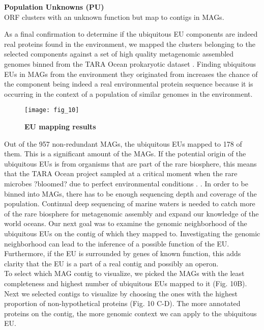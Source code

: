 \begin{table}[]
\textbf{Population Unknowns (PU)}\\
ORF clusters with an unknown function but map to contigs in MAGs. 

As a final confirmation to determine if the ubiquitous EU components are indeed real proteins found in the environment, we mapped the clusters belonging to the selected components against a set of high quality metagenomic assembled genomes binned from the TARA Ocean prokaryotic dataset \citep{Delmont_2017}. Finding ubiquitous EUs in MAGs from the environment they originated from increases the chance of the component being indeed a real environmental protein sequence because it is occurring in the context of a population of similar genomes in the environment. \\

\begin{figure}[h!]
	\centering
	\texttt{[image: fig\_10]}
	\caption{\textbf{EU mapping results}}\label{fig10}
\end{figure}

Out of the 957 non-redundant MAGs, the ubiquitous EUs mapped to 178 of them. This is a significant amount of the MAGs. If the potential origin of the ubiquitous EUs is from organisms that are part of the rare biosphere, this means that the TARA Ocean project sampled at a critical moment when the rare microbes ?bloomed? due to perfect environmental conditions \citep{Gobet_2011}. . In order to be binned into MAGs, there has to be enough sequencing depth and coverage of the population. Continual deep sequencing of marine waters is needed to catch more of the rare biosphere for metagenomic assembly and expand our knowledge of the world oceans. 
Our next goal was to examine the genomic neighborhood of the ubiquitous EUs on the contig of which they mapped to. Investigating the genomic neighborhood can lead to the inference of a possible function of the EU. Furthermore, if the EU is surrounded by genes of known function, this adds clarity that the EU is a part of a real contig and possibly an operon.\\

To select which MAG contig to visualize, we picked the MAGs with the least completeness and highest number of ubiquitous EUs mapped to it (Fig. 10B). Next we selected contigs to visualize by choosing the ones with the highest proportion of non-hypothetical proteins (Fig. 10 C-D). The more annotated proteins on the contig, the more genomic context we can apply to the ubiquitous EU. \\


\end{table}
